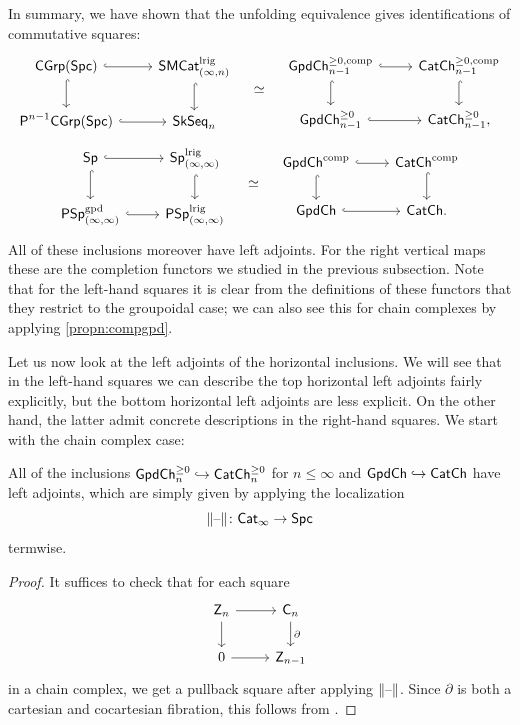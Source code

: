 \documentclass[a4paper,11pt]{article}
\begin{document}
In summary, we have shown that the unfolding equivalence gives
identifications of commutative squares:
\[
  \begin{tikzcd}
   \CGrp(\Spc) \ar[r, hookrightarrow] \ar[d, hookrightarrow] &
   \SMCatIn^{\lrig}  \ar[d, hookrightarrow] \\
   \PCGrp[n-1] \ar[r, hookrightarrow] & \SkSeq_{n}
 \end{tikzcd}
 \quad\simeq\quad
   \begin{tikzcd}
   \GpdChpc_{n-1} \ar[r, hookrightarrow] \ar[d, hookrightarrow] &
   \CChpc_{n-1}  \ar[d, hookrightarrow] \\
   \GpdChp_{n-1} \ar[r, hookrightarrow] & \CChp_{n-1},
 \end{tikzcd}
\]
\[
  \begin{tikzcd}
   \Sp \ar[r, hookrightarrow] \ar[d, hookrightarrow] &
   \SpIIl  \ar[d, hookrightarrow] \\
   \PSpIIgpd \ar[r, hookrightarrow] & \PSpIIl
 \end{tikzcd}
 \quad\simeq\quad
   \begin{tikzcd}
   \GpdChc \ar[r, hookrightarrow] \ar[d, hookrightarrow] &
   \CChc  \ar[d, hookrightarrow] \\
   \GpdCh \ar[r, hookrightarrow] & \CCh.
 \end{tikzcd}
\]
All of these inclusions moreover have left adjoints. For the right
vertical maps these are the completion functors we studied in the
previous subsection. Note that for the left-hand squares it is clear
from the definitions of these functors that they restrict to the
groupoidal case; we can also see this for chain complexes by applying
\cref{propn:compgpd}. 

Let us now look at the left adjoints of the horizontal inclusions. We
will see that in the left-hand squares we can describe the top
horizontal left adjoints fairly explicitly,
but the bottom horizontal left adjoints are less explicit. On the
other hand, the latter admit concrete descriptions in the right-hand
squares. We start with
the chain complex case:
\begin{propn}
  All of the inclusions $\textup{\textsf{GpdCh}}^{\geq 0}_{n} \hookrightarrow \textup{\textsf{CatCh}}^{\geq 0}_{n}$ for $n \leq \infty$
  and $\textup{\textsf{GpdCh}} \hookrightarrow \textup{\textsf{CatCh}}$
  have left
  adjoints, which are simply given by
  applying the localization \[\|\blank\| \colon \CatI \to \Spc\]
  termwise. 
\end{propn}
\begin{proof}
  It suffices  to check that for each square
  \[
    \begin{tikzcd}
     \oZ_{n} \ar[r] \ar[d] & \oC_{n}  \ar[d, "\partial"] \\
     0 \ar[r] & \oZ_{n-1}
    \end{tikzcd}
  \]
  in a chain
  complex, we get a pullback square after applying $\|\text{\textendash}\|$. Since
  $\partial$ is both a cartesian and cocartesian fibration, this
  follows from \cite[Theorem 2.3]{SteimleAdd}. 
\end{proof}
\end{document}
